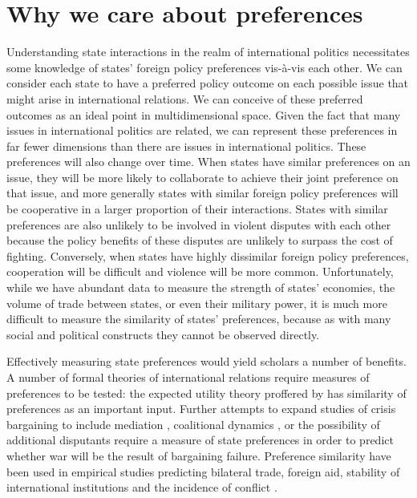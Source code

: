 \documentclass[12pt,pdflatex]{elsarticle}
\begin{document}
\newpage\setcounter{page}{1}


\section*{Why we care about preferences}

Understanding state interactions in the realm of international politics necessitates some knowledge of states' foreign policy preferences vis-\`{a}-vis each other.  We can consider each state to have a preferred policy outcome on each possible issue that might arise in international relations. We can conceive of these preferred outcomes as an ideal point in multidimensional space. Given the fact that many issues in international politics are related, we can represent these preferences in far fewer dimensions than there are issues in international politics. These preferences will also change over time. When states have similar preferences on an issue, they will be more likely to collaborate to achieve their joint preference on that issue, and more generally states with similar foreign policy preferences will be cooperative in a larger proportion of their interactions. States with similar preferences are also unlikely to be involved in violent disputes with each other because the policy benefits of these disputes are unlikely to surpass the cost of fighting. Conversely, when states have highly dissimilar foreign policy preferences, cooperation will be difficult and violence will be more common. Unfortunately, while we have abundant data to measure the strength of states' economies, the volume of trade between states, or even their military power, it is much more difficult to measure the similarity of states' preferences, because as with many social and political constructs they cannot be observed directly.

Effectively measuring state preferences would yield scholars a number of benefits. A number of formal theories of international relations require measures of preferences to be tested: the expected utility theory proffered by \citep{buenodemesquita:1983} has similarity of preferences as an important input. Further attempts to expand studies of crisis bargaining to include mediation \citep{kydd:2003}, coalitional dynamics \citep{wolford:2014}, or the possibility of additional disputants \citep{gallop:2017} require a measure of state preferences in order to predict whether war will be the result of bargaining failure. Preference similarity have been used in empirical studies predicting bilateral trade, foreign aid, stability of international institutions and the incidence of conflict \citep{derouen:heo:2004, stone:2004, gartzke:2007, kastner:2007, braumoeller:2008}.
\end{document}
